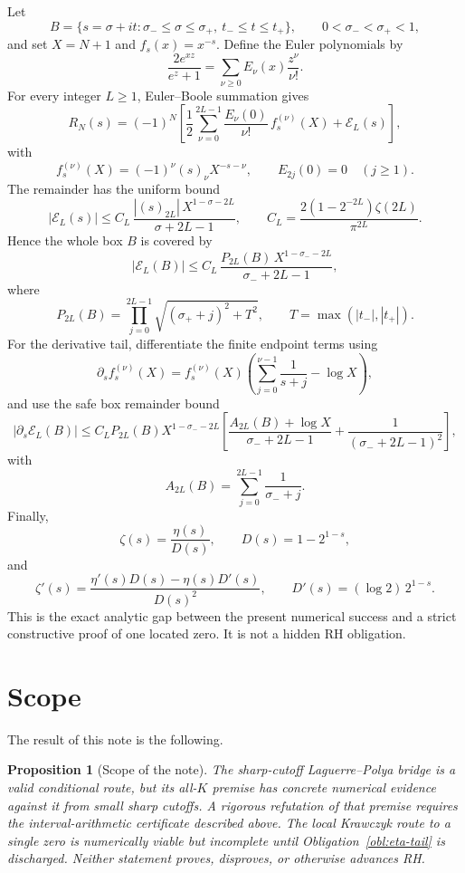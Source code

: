 \documentclass[11pt]{article}
\newtheorem{proposition}{Proposition}
\newcommand{\zetaR}{\zeta}
\begin{document}
Let
$$
  B=\{s=\sigma+it:\sigma_-\leq\sigma\leq\sigma_+,\ t_-\leq t\leq t_+\},
  \qquad 0<\sigma_-<\sigma_+<1,
$$
and set $X=N+1$ and $f_s(x)=x^{-s}$.  Define the Euler polynomials by
$$
  \frac{2e^{xz}}{e^z+1}
  =
  \sum_{\nu\geq0}E_\nu(x)\frac{z^\nu}{\nu!}.
$$
For every integer $L\geq1$, Euler--Boole summation gives
$$
  R_N(s)
  =
  (-1)^N
  \left[
  \frac12\sum_{\nu=0}^{2L-1}
  \frac{E_\nu(0)}{\nu!}\,
  f_s^{(\nu)}(X)
  +
  \mathcal E_L(s)
  \right],
$$
with
$$
  f_s^{(\nu)}(X)=(-1)^\nu(s)_\nu X^{-s-\nu},
  \qquad
  E_{2j}(0)=0\quad(j\geq1).
$$
The remainder has the uniform bound
$$
  |\mathcal E_L(s)|
  \leq
  C_L\,
  \frac{|(s)_{2L}|\,X^{1-\sigma-2L}}
  {\sigma+2L-1},
  \qquad
  C_L=\frac{2(1-2^{-2L})\zetaR(2L)}{\pi^{2L}}.
$$
Hence the whole box $B$ is covered by
$$
  |\mathcal E_L(B)|
  \leq
  C_L\,
  \frac{P_{2L}(B)\,X^{1-\sigma_- -2L}}
  {\sigma_-+2L-1},
$$
where
$$
  P_{2L}(B)=
  \prod_{j=0}^{2L-1}
  \sqrt{(\sigma_+ + j)^2+T^2},
  \qquad
  T=\max(|t_-|,|t_+|).
$$
For the derivative tail, differentiate the finite endpoint terms using
$$
  \partial_s f_s^{(\nu)}(X)
  =
  f_s^{(\nu)}(X)
  \left(
  \sum_{j=0}^{\nu-1}\frac1{s+j}
  -
  \log X
  \right),
$$
and use the safe box remainder bound
$$
  |\partial_s\mathcal E_L(B)|
  \leq
  C_L P_{2L}(B)X^{1-\sigma_- -2L}
  \left[
  \frac{A_{2L}(B)+\log X}{\sigma_-+2L-1}
  +
  \frac{1}{(\sigma_-+2L-1)^2}
  \right],
$$
with
$$
  A_{2L}(B)=\sum_{j=0}^{2L-1}\frac1{\sigma_-+j}.
$$
Finally,
$$
  \zetaR(s)=\frac{\eta(s)}{D(s)},
  \qquad
  D(s)=1-2^{1-s},
$$
and
$$
  \zetaR'(s)=
  \frac{\eta'(s)D(s)-\eta(s)D'(s)}{D(s)^2},
  \qquad
  D'(s)=(\log2)\,2^{1-s}.
$$
This is the exact analytic gap between the present numerical success and a
strict constructive proof of one located zero.  It is not a hidden RH
obligation.

\section{Scope}

The result of this note is the following.

\begin{proposition}[Scope of the note]
The sharp-cutoff Laguerre--Polya bridge is a valid conditional route, but its
all-$K$ premise has concrete numerical evidence against it from small sharp
cutoffs.  A rigorous refutation of that premise requires the
interval-arithmetic certificate described above.  The local Krawczyk route to
a single zero is numerically viable but incomplete until
Obligation~\ref{obl:eta-tail} is discharged.
Neither statement proves, disproves, or otherwise advances RH.
\end{proposition}
\end{document}
